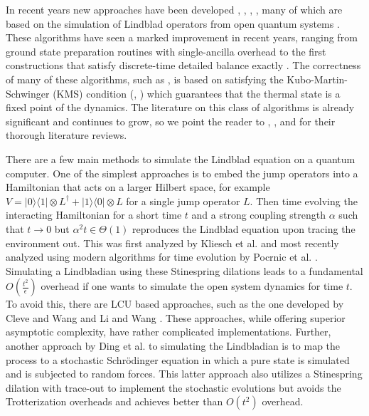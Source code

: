 \documentclass[
 amsmath,amssymb,
 aps,
onecolumn, 
nofootinbib]{revtex4-2}
\newcommand{\ketbra}[2]{| #1\rangle\! \langle #2|}
\newcommand{\tp}{\otimes}
\begin{document}
In recent years new approaches have been developed \cite{chen2023quantumthermalstatepreparation}, \cite{gilyen2024quantumgeneralizationsglaubermetropolis}, \cite{motlagh2024ground}, \cite{motta2019} \cite{ding2024single}, many of which are based on the simulation of Lindblad operators from open quantum systems \cite{davies1974markovian}. These algorithms have seen a marked improvement in recent years, ranging from ground state preparation routines with single-ancilla overhead \cite{ding2024single} to the first constructions that satisfy discrete-time detailed balance exactly \cite{gilyen2024quantumgeneralizationsglaubermetropolis}. The correctness of many of these algorithms, such as \cite{ding2024efficientquantumgibbssamplers}, is based on satisfying the Kubo-Martin-Schwinger (KMS) condition (\cite{kms2}, \cite{kms1}) which guarantees that the thermal state is a fixed point of the dynamics. The literature on this class of algorithms is already significant and continues to grow, so we point the reader to \cite{gilyen2024quantumgeneralizationsglaubermetropolis}, \cite{dalzell2023quantumalgorithmssurveyapplications}, \cite{chen2023quantumthermalstatepreparation} and \cite{rouze2024efficientthermalizationuniversalquantum} for their thorough literature reviews. 

There are a few main methods to simulate the Lindblad equation on a quantum computer. One of the simplest approaches is to embed the jump operators into a Hamiltonian that acts on a larger Hilbert space, for example $V = \ketbra{0}{1} \tp L^\dagger + \ketbra{1}{0} \tp L $ for a single jump operator $L$. Then time evolving the interacting Hamiltonian for a short time $t$ and a strong coupling strength $\alpha$ such that $t \to 0$ but $\alpha^2 t \in \Theta(1)$ reproduces the Lindblad equation upon tracing the environment out. This was first analyzed by Kliesch et al. \cite{kliesch2011dissipative} and most recently analyzed using modern algorithms for time evolution by Pocrnic et al. \cite{pocrnic2024quantumsimulationlindbladiandynamics}. Simulating a Lindbladian using these Stinespring dilations leads to a fundamental $O\left( \frac{t^2}{\epsilon}\right)$ overhead if one wants to simulate the open system dynamics for time $t$. To avoid this, there are LCU based approaches, such as the one developed by Cleve and Wang \cite{cleve2016efficient} and Li and Wang \cite{li2022simulating}. These approaches, while offering superior asymptotic complexity, have rather complicated implementations. Further, another approach by Ding et al. \cite{ding2024simulating}to simulating the Lindbladian is to map the process to a stochastic Schrödinger equation in which a pure state is simulated and is subjected to random forces. This latter approach also utilizes a Stinespring dilation with trace-out to implement the stochastic evolutions but avoids the Trotterization overheads and achieves better than $O(t^2)$ overhead. 
\end{document}
